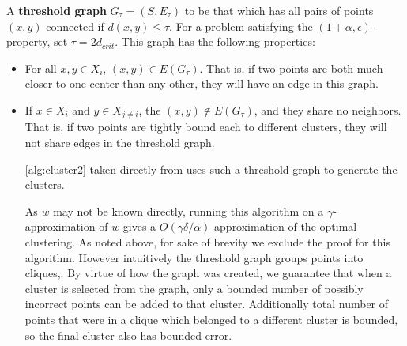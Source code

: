 \documentclass[paper=a4, fontsize=10.5pt]{scrartcl} %
\numberwithin{equation}{section} %
\numberwithin{figure}{section} %
\numberwithin{table}{section} %
\begin{document}
A \textbf{threshold graph} $G_\tau = (S, E_\tau)$ to be that which has all pairs of points $(x, y)$ connected if $d(x, y) \leq \tau$. For a problem satisfying the $(1 + \alpha, \epsilon)$-property, set $\tau = 2d_{crit}$. This graph has the following properties:

\begin{itemize}
\item For all $x, y \in X_i$, $(x,y) \in E(G_\tau)$. That is, if two points are both much closer to one center than any other, they will have an edge in this graph.

\item If $x \in X_i$ and $y \in X_{j \neq i}$, the $(x,y) \notin E(G_\tau)$, and they share no neighbors. That is, if two points are tightly bound each to different clusters, they will not share edges in the threshold graph. 

\ref{alg:cluster2} taken directly from \cite{firstpaper} uses such a threshold graph to generate the clusters.

As $w$ may not be known directly, running this algorithm on a $\gamma$-approximation of $w$ gives a $O(\gamma\delta/\alpha)$ approximation of the optimal clustering. As noted above, for sake of brevity we exclude the proof for this algorithm. However intuitively the threshold graph groups points into cliques,. By virtue of how the graph was created, we guarantee that when a cluster is selected from the graph, only a bounded number of possibly incorrect points can be added to that cluster. Additionally total number of points that were in a clique which belonged to a different cluster is bounded, so the final cluster also has bounded error. 

\end{itemize}
{}

\end{document}
